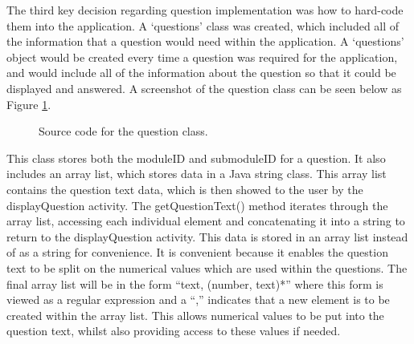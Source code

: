 \documentclass{article}
\begin{document}
The third key decision regarding question implementation was how to hard-code them into the application. A `questions' class was created, which included all of the information that a question would need within the application. A `questions' object would be created every time a question was required for the application, and would include all of the information about the question so that it could be displayed and answered. A screenshot of the question class can be seen below as Figure \ref{figure:questionClass}. 

\begin{figure}[H]
	\centering
	\caption{Source code for the question class.}
	\label{figure:questionClass}
\end{figure}

This class stores both the moduleID and submoduleID for a question. It also includes an array list, which stores data in a Java string class. This array list contains the question text data, which is then showed to the user by the displayQuestion activity. The getQuestionText() method iterates through the array list, accessing each individual element and concatenating it into a string to return to the displayQuestion activity. This data is stored in an array list instead of as a string for convenience. It is convenient because it enables the question text to be split on the numerical values which are used within the questions. The final array list will be in the form ``text, (number, text)*'' where this form is viewed as a regular expression and a ``,'' indicates that a new element is to be created within the array list. This allows numerical values to be put into the question text, whilst also providing access to these values if needed. \par
\end{document}
